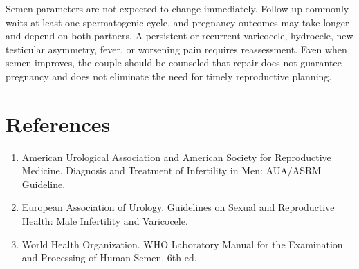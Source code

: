Semen parameters are not expected to change immediately. Follow-up commonly waits at least one spermatogenic cycle, and pregnancy outcomes may take longer and depend on both partners. A persistent or recurrent varicocele, hydrocele, new testicular asymmetry, fever, or worsening pain requires reassessment. Even when semen improves, the couple should be counseled that repair does not guarantee pregnancy and does not eliminate the need for timely reproductive planning.

\section*{References}
\begin{enumerate}
  \item American Urological Association and American Society for Reproductive Medicine. Diagnosis and Treatment of Infertility in Men: AUA/ASRM Guideline.
  \item European Association of Urology. Guidelines on Sexual and Reproductive Health: Male Infertility and Varicocele.
  \item World Health Organization. WHO Laboratory Manual for the Examination and Processing of Human Semen. 6th ed.
\end{enumerate}

\clearpage
